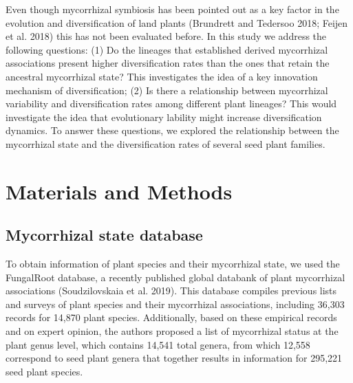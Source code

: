 \documentclass[
  12pt,
]{article}
\begin{document}
Even though mycorrhizal symbiosis has been pointed out as a key factor
in the evolution and diversification of land plants (Brundrett and
Tedersoo 2018; Feijen et al. 2018) this has not been evaluated before.
In this study we address the following questions: (1) Do the lineages
that established derived mycorrhizal associations present higher
diversification rates than the ones that retain the ancestral
mycorrhizal state? This investigates the idea of a key innovation
mechanism of diversification; (2) Is there a relationship between
mycorrhizal variability and diversification rates among different plant
lineages? This would investigate the idea that evolutionary lability
might increase diversification dynamics. To answer these questions, we
explored the relationship between the mycorrhizal state and the
diversification rates of several seed plant families.

\hypertarget{materials-and-methods}{%
\section{Materials and Methods}\label{materials-and-methods}}

\hypertarget{mycorrhizal-state-database}{%
\subsection{Mycorrhizal state
database}\label{mycorrhizal-state-database}}

To obtain information of plant species and their mycorrhizal state, we
used the FungalRoot database, a recently published global databank of
plant mycorrhizal associations (Soudzilovskaia et al. 2019). This
database compiles previous lists and surveys of plant species and their
mycorrhizal associations, including 36,303 records for 14,870 plant
species. Additionally, based on these empirical records and on expert
opinion, the authors proposed a list of mycorrhizal status at the plant
genus level, which contains 14,541 total genera, from which 12,558
correspond to seed plant genera that together results in information for
295,221 seed plant species.
\end{document}
